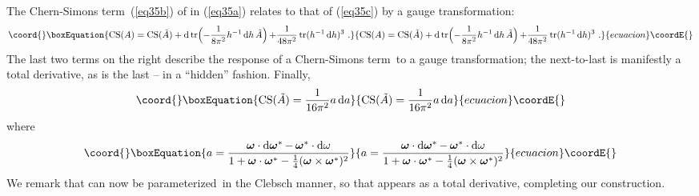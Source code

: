 \documentclass[a4paper,12pt,twoside]{article}
\providecommand{\rd}[1]{\mathop{\mathrm{d}#1}}
\providecommand{\tr}{\mathop{\mathrm{tr}}}
\providecommand{\CSt}{Chern-Simons term}
\providecommand{\prd}{para\-me\-ter\-ized}
\providecommand{\numeq}[2]{\begin{equation}\coord{}\boxEquation{
#2
\label{#1}
}{
#2
}{ecuacion}\coordE{}\end{equation}}
\providecommand{\refeq}[1]{(\ref{#1})}
\let\vec\boldsymbol
\begin{document}
The \CSt\  \refeq{eq35b} of \coordHE{} in \refeq{eq35a} relates to that of \refeq{eq35c} by
a gauge transformation:
\numeq{eq36}{
\text{CS}(A) = \text{CS}(\tilde A) + \rd{\tr\Bigl(-\frac1{8\pi^2} h^{-1}\rd h \tilde A
\Bigr)} + \frac1{48\pi^2} \tr (h^{-1}\rd h)^3 \ .
 }
The last two terms on the right describe the response of a \CSt\ to a gauge
transformation; the next-to-last is manifestly a total derivative, as is the last  --
in a ``hidden'' fashion. Finally,
\numeq{eq37}{
\text{CS}(\tilde A) = \frac1{16\pi^2} a\rd a 
}
where
\numeq{eq38}{
a = \frac{\vec\omega\cdot \rd{\vec\omega^*}- \,\vec\omega^*\cdot\rd\omega}{1
+\vec\omega\cdot\vec\omega^* - \frac14(\vec\omega\times\vec\omega^*)^2}
 }
We remark that \coordHE{} can now be \prd\ in the Clebsch manner, so that \myHighlight{$a\rd a$}\coordHE{}
appears as a total derivative, completing our construction.
\end{document}
